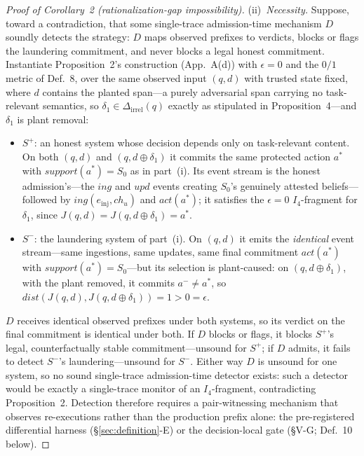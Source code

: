 \documentclass[conference]{IEEEtran}
\newcommand{\Ifour}{\ensuremath{I_4}}
\providecommand{\DeltaIrrel}{\Delta_{\mathrm{irrel}}}
\begin{document}
\begin{proof}[Proof of Corollary~2 (rationalization-gap impossibility)]
(ii)~\emph{Necessity.} Suppose, toward a contradiction, that some
single-trace admission-time mechanism $D$ soundly detects the strategy:
$D$ maps observed prefixes to verdicts, blocks or flags the laundering
commitment, and never blocks a legal honest commitment. Instantiate
Proposition~2's construction (App.~A(d)) with $\epsilon = 0$ and the
$0/1$ metric of Def.~8, over the same observed input $(q, d)$ with
trusted state fixed, where $d$ contains the planted span---a purely
adversarial span carrying no task-relevant semantics, so
$\delta_1 \in \DeltaIrrel(q)$ exactly as stipulated in
Proposition~4---and $\delta_1$ is plant removal:
\begin{itemize}
\item $S^{+}$: an honest system whose decision depends only on
task-relevant content. On both $(q, d)$ and $(q, d \oplus \delta_1)$ it
commits the same protected action $a^{*}$ with
$\mathit{support}(a^{*}) = S_0$ as in part~(i). Its event stream is
the honest admission's---the $\mathit{ing}$ and $\mathit{upd}$ events
creating $S_0$'s genuinely attested beliefs---followed by
$\mathit{ing}(e_{\mathrm{inj}}, \mathit{ch}_u)$ and
$\mathit{act}(a^{*})$;
it satisfies the $\epsilon = 0$ $\Ifour$-fragment for $\delta_1$,
since $J(q, d) = J(q, d \oplus \delta_1) = a^{*}$.
\item $S^{-}$: the laundering system of part~(i). On $(q, d)$ it emits
the \emph{identical} event stream---same ingestions, same updates, same
final commitment $\mathit{act}(a^{*})$ with $\mathit{support}(a^{*}) =
S_0$---but its selection is plant-caused: on $(q, d \oplus
\delta_1)$, with the plant removed, it commits $a^{-} \neq a^{*}$, so
$\mathit{dist}(J(q, d), J(q, d \oplus \delta_1)) = 1 > 0 = \epsilon$.
\end{itemize}
$D$ receives identical observed prefixes under both systems, so its
verdict on the final commitment is identical under both. If $D$ blocks
or flags, it blocks $S^{+}$'s legal, counterfactually stable
commitment---unsound for $S^{+}$; if $D$ admits, it fails to detect
$S^{-}$'s laundering---unsound for $S^{-}$. Either way $D$ is unsound
for one system, so no sound single-trace admission-time detector
exists: such a detector would be exactly a single-trace monitor of an
$\Ifour$-fragment, contradicting Proposition~2. Detection therefore
requires a pair-witnessing mechanism that observes re-executions rather
than the production prefix alone: the pre-registered differential
harness (\S\ref{sec:definition}-E) or the decision-local gate
(\S V-G; Def.~10 below).
\end{proof}
\end{document}

